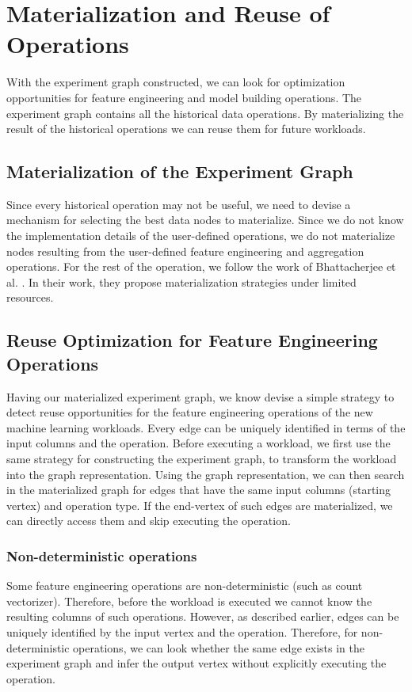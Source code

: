 \section{Materialization and Reuse of Operations}\label{sec-materializaiton-and-reuse}
With the experiment graph constructed, we can look for optimization opportunities for feature engineering and model building operations.
The experiment graph contains all the historical data operations.
By materializing the result of the historical operations we can reuse them for future workloads.

\subsection{Materialization of the Experiment Graph}
Since every historical operation may not be useful, we need to devise a mechanism for selecting the best data nodes to materialize.
Since we do not know the implementation details of the user-defined operations, we do not materialize nodes resulting from the user-defined feature engineering and aggregation operations.
For the rest of the operation, we follow the work of Bhattacherjee et al. \cite{bhattacherjee2015principles}.
In their work, they propose materialization strategies under limited resources.


\subsection{Reuse Optimization for Feature Engineering Operations}
Having our materialized experiment graph, we know devise a simple strategy to detect reuse opportunities for the feature engineering operations of the new machine learning workloads.
Every edge can be uniquely identified in terms of the input columns and the operation.
Before executing a workload, we first use the same strategy for constructing the experiment graph, to transform the workload into the graph representation.
Using the graph representation, we can then search in the materialized graph for edges that have the same input columns (starting vertex) and operation type.
If the end-vertex of such edges are materialized, we can directly access them and skip executing the operation.

\subsubsection{Non-deterministic operations}
Some feature engineering operations are non-deterministic (such as count vectorizer).
Therefore, before the workload is executed we cannot know the resulting columns of such operations.
However, as described earlier, edges can be uniquely identified by the input vertex and the operation.
Therefore, for non-deterministic operations, we can look whether the same edge exists in the experiment graph and infer the output vertex without explicitly executing the operation.

